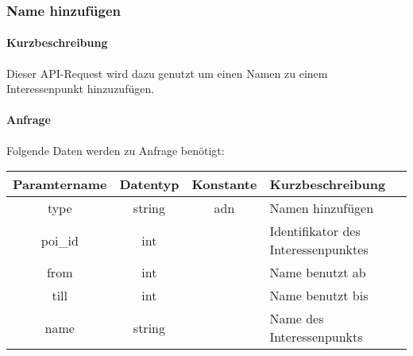 \subsubsection{Name hinzufügen}
\paragraph{Kurzbeschreibung}Dieser API-Request wird dazu genutzt um einen Namen zu einem Interessenpunkt hinzuzufügen.
\paragraph{Anfrage}Folgende Daten werden zu Anfrage benötigt:
\begin{table}[H]
	\begin{tabular}{|c|c|c|p{6.5cm}|}
		\hline
		\textbf{Paramtername} & \textbf{Datentyp} & \textbf{Konstante} & \textbf{Kurzbeschreibung}                                                                                               \\ \hline
		type                & string            & adn                & Namen hinzufügen \\ \hline
		poi\_id             & int               &                    & Identifikator des Interessenpunktes \\ \hline
		from                & int               &                    & Name benutzt ab \\ \hline
		till                & int               &                    & Name benutzt bis \\ \hline
		name                & string            &                    & Name des Interessenpunkts \\ \hline
	\end{tabular}
\end{table}
